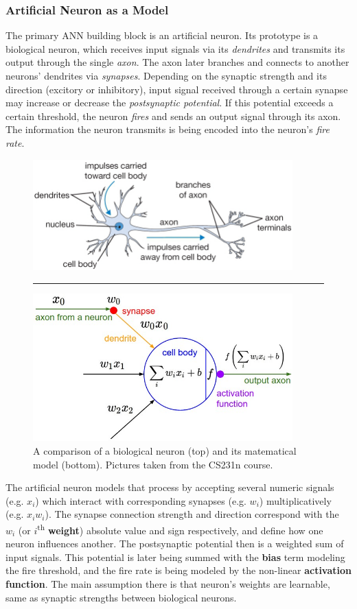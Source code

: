 \documentclass[thesis=B,english]{FITthesis}[2019/12/23]
\begin{document}
	\subsubsection{Artificial Neuron as a Model}
	The primary ANN building block is an artificial neuron. Its prototype is a biological neuron, which receives input signals via its \textit{dendrites} and transmits its output through the single \textit{axon}. The axon later branches and connects to another neurons' dendrites via \textit{synapses}. Depending on the synaptic strength and its direction (excitory or inhibitory), input signal received through a certain synapse may increase or decrease the \textit{postsynaptic potential}. If this potential exceeds a certain threshold, the neuron \textit{fires} and sends an output signal through its axon. The information the neuron transmits is being encoded into the neuron's \textit{fire rate}.
	
	\begin{figure}[h]
		\includegraphics[width=10cm]{images/neuron.png}
		\noindent\rule{8cm}{0.4pt}
		\includegraphics[width=10cm]{images/neuron_model.jpeg}
		\centering
		\caption{A comparison of a biological neuron (top) and its matematical model (bottom). Pictures taken from the CS231n course\cite{cs231n}.}
	\end{figure}
	
	The artificial neuron models that process by accepting several numeric signals (e.g. $x_i$) which interact with corresponding synapses (e.g. $w_i$) multiplicatively (e.g. $x_iw_i$). The synapse connection strength and direction correspond with the $w_i$ (or $i$\textsuperscript{th} \textbf{weight}) absolute value and sign respectively, and define how one neuron influences another. The postsynaptic potential then is a weighted sum of input signals. This potential is later being summed with the \textbf{bias} term modeling the fire threshold, and the fire rate is being modeled by the non-linear \textbf{activation function}. The main assumption there is that neuron's weights are learnable, same as synaptic strengths between biological neurons.
	
\end{document}
